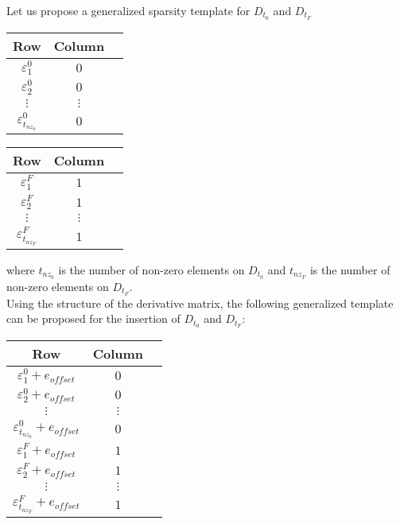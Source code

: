 \documentclass[12pt]{article}
\begin{document}
Let us propose a generalized sparsity template for $D_{t_0}$ and $D_{t_F}$ 

\begin{table}[h]
\begin{center}
\begin{tabular}{c|c|c}
Row                 & Column            \\ \hline
$\varepsilon^0_1$          & $0$         \\
$\varepsilon^0_2$          & $0$         \\
$\vdots$            & $\vdots$          \\
$\varepsilon^0_{t_{nz_0}}$   & $0$  \\
\end{tabular}
\end{center}
\end{table}
\begin{table}[h]
\begin{center}
\begin{tabular}{c|c|c}
Row                 & Column            \\ \hline
$\varepsilon^F_1$          & $1$         \\
$\varepsilon^F_2$          & $1$         \\
$\vdots$            & $\vdots$          \\
$\varepsilon^F_{t_{nz_F}}$   & $1$  \\
\end{tabular}
\end{center}
\end{table}

\noindent where $t_{nz_0}$ is the number of non-zero elements on $D_{t_0}$ and $t_{nz_F}$ is the number of non-zero elements on $D_{t_F}$.\\

\noindent Using the structure of the derivative matrix, the following generalized template can be proposed for the insertion of $D_{t_0}$ and $D_{t_F}$: 

\begin{table}[!h]
\begin{center}
\begin{tabular}{c|c|c}
Row                 & Column            \\ \hline
$\varepsilon^0_1+e_{offset}$          & $0$         \\
$\varepsilon^0_2+e_{offset}$         & $0$         \\
$\vdots$            & $\vdots$          \\
$\varepsilon^0_{t_{nz_0}}+e_{offset}$   & $0$  \\
$\varepsilon^F_1+e_{offset}$          & $1$         \\
$\varepsilon^F_2+e_{offset}$         & $1$         \\
$\vdots$            & $\vdots$          \\
$\varepsilon^F_{t_{nz_F}}+e_{offset}$   & $1$  \\
\end{tabular}
\end{center}
\end{table}
\end{document}
